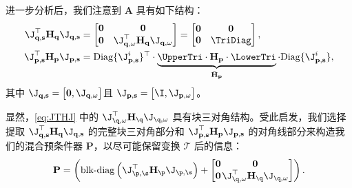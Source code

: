 进一步分析后，我们注意到 $\mathbf{A}$ 具有如下结构：
\begin{equation}
  \begin{aligned}
    \J_{\mathbf{q, s}}^{\top} \mathbf{H}_{\mathbf{q}} \J_{\mathbf{q, s}} & =
    \begin{bmatrix}
      \mathbf{0} & \mathbf{0}                                                                   \\
      \mathbf{0} & \J_{\mathbf{q, \omega}}^{\top}\mathbf{H}_{\mathbf{q}}\J_{\mathbf{q, \omega}}
    \end{bmatrix} =
    \begin{bmatrix}
      \mathbf{0} & \mathbf{0} \\
      \mathbf{0} & \TriDiag
    \end{bmatrix}
    ,                                                                        \\
    \J^{\top}_{\mathbf{p, s}} \mathbf{H}_{\mathbf{p}} \J_{\mathbf{p, s}} & =
    \mathrm{Diag}\{\J^{i}_{\mathbf{p,s}}\}^{\top} \cdot
    \underbrace{
    \UpperTri \cdot \mathbf{H}_{\mathbf{p}}\cdot \LowerTri}_{\bar{\mathbf{H}}_{\mathbf{p}}}
    \cdot \mathrm{Diag}\{\J^{i}_{\mathbf{p,s}}\},
  \end{aligned}
  \label{eq:JTHJ}
\end{equation}
其中 $\J_{\mathbf{q, s}} =
  \begin{bmatrix}
    \mathbf{0}, \J_{\mathbf{q,\omega}}
  \end{bmatrix}
$且 $\J_{\mathbf{p, s}} =
  \begin{bmatrix}
    \I, \J_{\mathbf{p, \omega}}
  \end{bmatrix}$。

显然，\cref{eq:JTHJ} 中的 $ \J_{\q,\omega}^\top \mathbf{H}_\q \J_{\q, \omega}$ 具有块三对角结构。受此启发，我们选择提取 $\J_{\mathbf{q, s}}^{\top} \mathbf{H}_{\mathbf{q}} \J_{\mathbf{q, s}}$ 的完整块三对角部分和 $\J^{\top}_{\mathbf{p, s}} \mathbf{H}_{\mathbf{p}} \J_{\mathbf{p, s}}$ 的对角线部分来构造我们的混合预条件器 $\mathbf P$，以尽可能保留变换 $\mathcal T$ 后的信息：
\begin{equation}
  \setlength{\arraycolsep}{0.5pt}
  \mathbf{P} =\left(\operatorname{blk-diag}\left(\J_{\p, \s}^\top \mathbf{H}_{\p} \J_{\p, \s}\right) + \begin{bmatrix} \mathbf{0} & \mathbf{0} \\ \mathbf{0}  & \J_{\q,\omega}^\top \mathbf{H}_\q \J_{\q, \omega} \end{bmatrix}\right).
  \label{eq:preconditioner_structure}
\end{equation}

